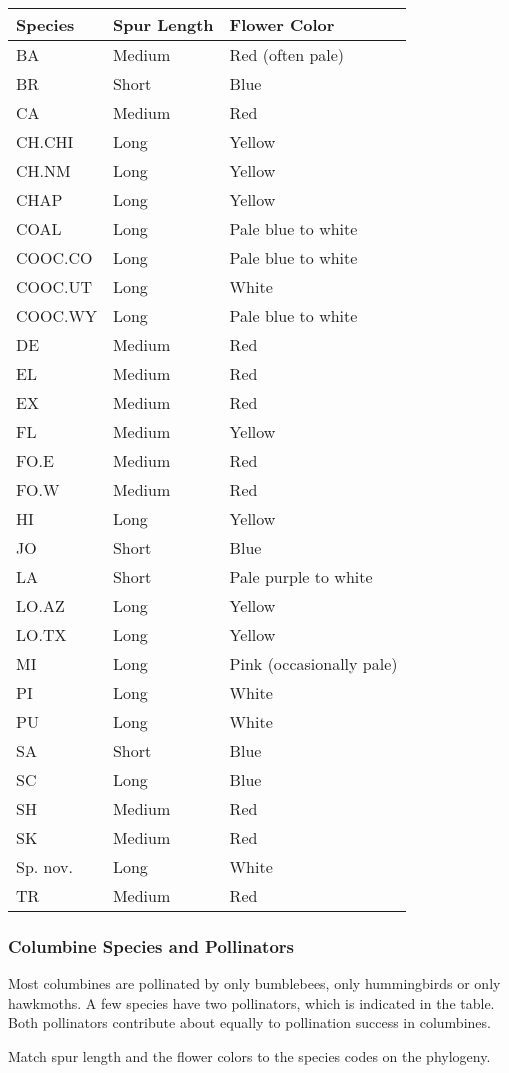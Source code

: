 \documentclass[12pt, hidelinks]{exam}
\begin{document}
\begin{tabular}[c]{@{}lll@{}}
\toprule
Species & Spur Length & Flower Color\tabularnewline
\midrule
BA 				& Medium	& Red (often pale)\tabularnewline
BR 				& Short 	& Blue\tabularnewline
CA 				& Medium	& Red\tabularnewline
CH.CHI 		& Long 		& Yellow\tabularnewline
CH.NM 		& Long 		& Yellow\tabularnewline
CHAP 			& Long 		& Yellow\tabularnewline
COAL 			& Long 		& Pale blue to white\tabularnewline
COOC.CO	& Long 		& Pale blue to white\tabularnewline
COOC.UT 	& Long		& White\tabularnewline
COOC.WY 	& Long		& Pale blue to white\tabularnewline
DE 				& Medium	& Red\tabularnewline
EL 				& Medium	& Red\tabularnewline
EX 				& Medium	& Red\tabularnewline
FL 				& Medium	& Yellow\tabularnewline
FO.E 			& Medium	& Red\tabularnewline
FO.W 			& Medium	& Red\tabularnewline
HI 				& Long		& Yellow\tabularnewline
JO				& Short 	& Blue\tabularnewline
LA 				& Short 	& Pale purple to white\tabularnewline
LO.AZ 			& Long		& Yellow\tabularnewline
LO.TX 			& Long		& Yellow\tabularnewline
MI					& Long		& Pink (occasionally pale)\tabularnewline
PI 				& Long 		& White\tabularnewline
PU				& Long 		& White\tabularnewline
SA				& Short		& Blue\tabularnewline
SC 				& Long 		& Blue\tabularnewline
SH 				& Medium	& Red\tabularnewline
SK				& Medium	& Red\tabularnewline
Sp. nov.\footnotemark	& Long & White\tabularnewline
TR 				& Medium	& Red\tabularnewline
\bottomrule
\end{tabular}



\newpage

\subsubsection*{Columbine Species and Pollinators}

Most columbines are pollinated by only bumblebees, only hummingbirds or
only hawkmoths. A few species have two pollinators, which is indicated
in the table. Both pollinators contribute about equally to pollination
success in columbines.

Match spur length and the flower colors to the species codes on the phylogeny.
\end{document}

